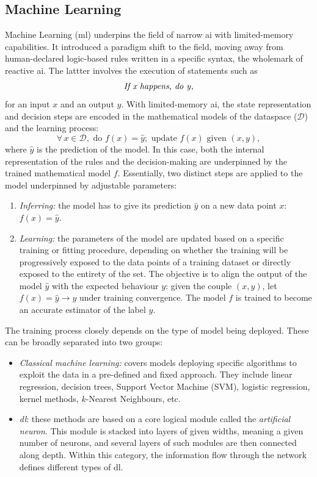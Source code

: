 \subsection{Machine Learning} 
Machine Learning (\gls{ml}) underpins the field of narrow \gls{ai} with limited-memory capabilities. It introduced a paradigm shift to the field, moving away from human-declared logic-based rules written in a specific syntax, the wholemark of reactive \gls{ai}. The lattter involves the execution of statements such as \[\textrm{\textit{If x happens, do y}},\] for an input $x$ and an output $y$. With limited-memory \gls{ai}, the state representation and decision steps are encoded in the mathematical models of the dataspace ($\mathcal{D}$) and the learning process: \[\forall\, x \in \mathcal{D}, \textrm{ do }f(x) = \hat{y}; \textrm{ update }f(x) \textrm{ given } (x, y),\] where $\hat{y}$ is the prediction of the model. In this case, both the internal representation of the rules and the decision-making are underpinned by the trained mathematical model $f$. Essentially, two distinct steps are applied to the model underpinned by adjustable parameters: 
\begin{enumerate}
    \item \textit{Inferring:} the model has to give its prediction $\hat{y}$ on a new data point $x$: $f(x) = \hat{y}$.
    \item \textit{Learning:} the parameters of the model are updated based on a specific training or fitting procedure, depending on whether the training will be progressively exposed to the data points of a training dataset or directly exposed to the entirety of the set. The objective is to align the output of the model $\hat{y}$ with the expected behaviour $y$: given the couple $(x, y)$, let $f(x) = \hat{y} \rightarrow y$ under training convergence. The model $f$ is trained to become an accurate estimator of the label $y$.
\end{enumerate}
The training process closely depends on the type of model being deployed. These can be broadly separated into two groups:
\begin{itemize}
    \item \textit{Classical machine learning:} covers models deploying specific algorithms to exploit the data in a pre-defined and fixed approach. They include linear regression, decision trees, Support Vector Machine (SVM), logistic regression, kernel methods, $k$-Nearest Neighbours, etc.
    \item \textit{\gls{dl}}: these methods are based on a core logical module called the \textit{artificial neuron}. This module is stacked into layers of given widths, meaning a given number of neurons, and several layers of such modules are then connected along depth. Within this category, the information flow through the network defines different types of \gls{dl}.
\end{itemize}
